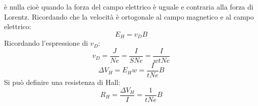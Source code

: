 \begin{Es}
è nulla cioè quando la forza del campo elettrico è uguale e contraria alla forza di Lorentz. Ricordando che la velocità è ortogonale al campo magnetico e al campo elettrico:
\begin{equation*}E_H=v_DB\end{equation*}
Ricordando l'espressione di $v_D$:
\begin{equation*}v_D=\frac{J}{Ne}=\frac{I}{SNe}=\frac{I}{wtNe}\end{equation*}
\begin{equation*}\Delta V_H=E_Hw=\frac{I}{tNe}B\end{equation*}
Si può definire una resistenza di Hall:
\begin{equation*}
 R_H = \frac{\Delta V_H}{I}=\frac{1}{tNe}B
\end{equation*}
\end{Es}

